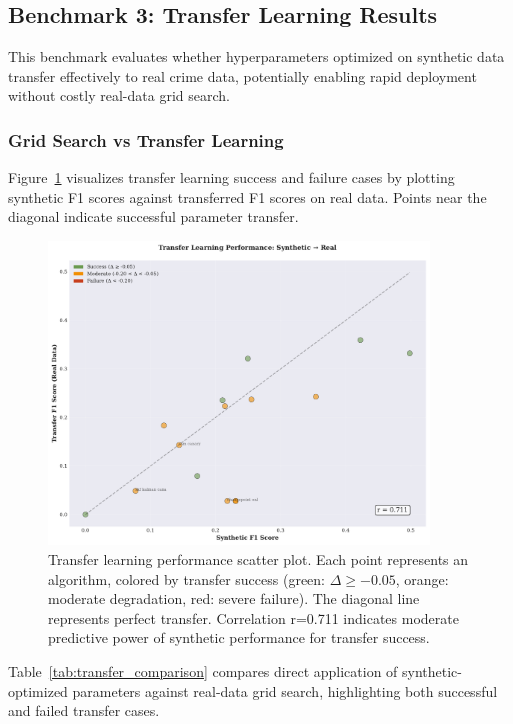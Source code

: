 \subsection{Benchmark 3: Transfer Learning Results}
\label{sec:results_transfer}

This benchmark evaluates whether hyperparameters optimized on synthetic data transfer effectively to real crime data, potentially enabling rapid deployment without costly real-data grid search.

\subsubsection{Grid Search vs Transfer Learning}

Figure~\ref{fig:transfer_scatter} visualizes transfer learning success and failure cases by plotting synthetic F1 scores against transferred F1 scores on real data. Points near the diagonal indicate successful parameter transfer.

\begin{figure}[H]
\centering
\includegraphics[width=0.9\textwidth]{figures/fig_transfer_learning_scatter.pdf}
\caption{Transfer learning performance scatter plot. Each point represents an algorithm, colored by transfer success (green: $\Delta \geq -0.05$, orange: moderate degradation, red: severe failure). The diagonal line represents perfect transfer. Correlation r=0.711 indicates moderate predictive power of synthetic performance for transfer success.}
\label{fig:transfer_scatter}
\end{figure}

Table~\ref{tab:transfer_comparison} compares direct application of synthetic-optimized parameters against real-data grid search, highlighting both successful and failed transfer cases.

